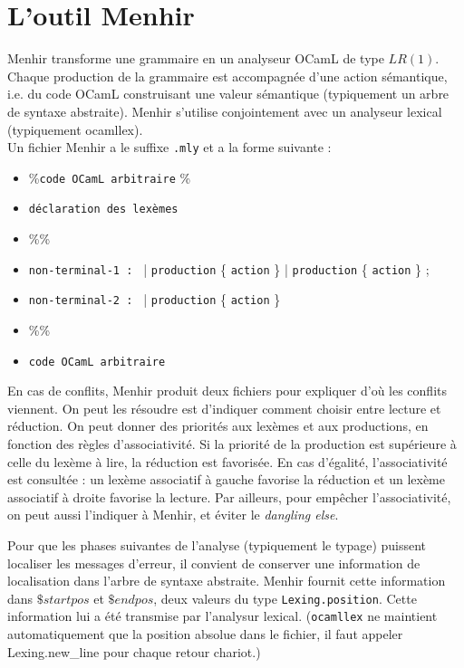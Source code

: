\documentclass{cours}
\begin{document}
\section{L'outil Menhir}
Menhir transforme une grammaire en un analyseur OCamL de type $LR(1)$. Chaque production de la grammaire est accompagnée d'une action sémantique, i.e. du code OCamL construisant une valeur sémantique (typiquement un arbre de syntaxe abstraite). Menhir s'utilise conjointement avec un analyseur lexical (typiquement \textrm{ocamllex}).\\
Un fichier Menhir a le suffixe \texttt{.mly} et a la forme suivante :
\begin{itemize}
    \item \%{\texttt{code OCamL arbitraire} \%}
    \item \texttt{déclaration des lexèmes}
    \item \%\%
    \item \texttt{non-terminal-1 : }
          | \texttt{production} \{ \texttt{action} \}
          | \texttt{production} \{ \texttt{action} \}
          ;
    \item \texttt{non-terminal-2 : }
          | \texttt{production} \{ \texttt{action} \}
    \item \%\%
    \item \texttt{code OCamL arbitraire}
\end{itemize}
En cas de conflits, Menhir produit deux fichiers pour expliquer d'où les conflits viennent. On peut les résoudre est d'indiquer comment choisir entre lecture et réduction. On peut donner des priorités aux lexèmes et aux productions, en fonction des règles d'associativité. Si la priorité de la production est supérieure à celle du lexème à lire, la réduction est favorisée. En cas d'égalité, l'associativité est consultée : un lexème associatif à gauche favorise la réduction et un lexème associatif à droite favorise la lecture. Par ailleurs, pour empêcher l'associativité, on peut aussi l'indiquer à Menhir, et éviter le \textit{dangling else}.

Pour que les phases suivantes de l'analyse (typiquement le typage) puissent localiser les messages d'erreur, il convient de conserver une information de localisation dans l'arbre de syntaxe abstraite. Menhir fournit cette information dans $\$startpos$ et $\$endpos$, deux valeurs du type \texttt{Lexing.position}. Cette information lui a été transmise par l'analysur lexical. (\texttt{ocamllex} ne maintient automatiquement que la position absolue dans le fichier, il faut appeler Lexing.new\_line pour chaque retour chariot.)
\end{document}
